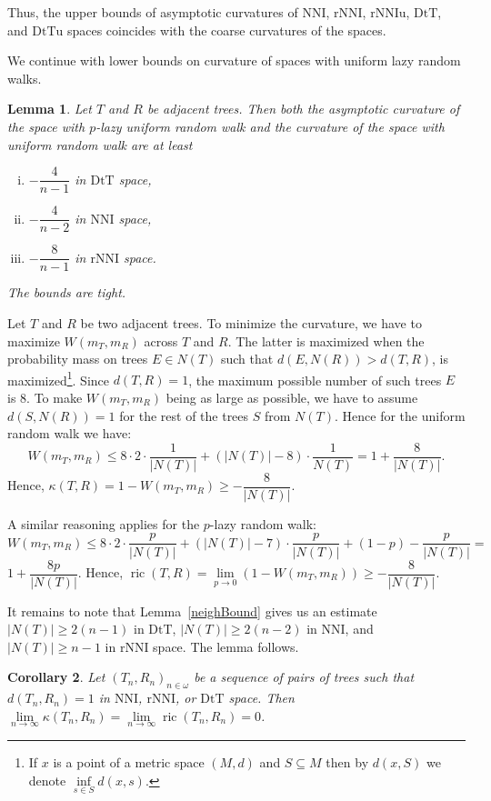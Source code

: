 \documentclass{amsart}
\newtheorem{lemma}{Lemma}
\newtheorem{corollary}[lemma]{Corollary}
\theoremstyle{definition}
\newcommand{\nni}{\mathrm{NNI}}
\newcommand{\rnni}{\mathrm{rNNI}}
\newcommand{\rnniu}{\mathrm{rNNIu}}
\newcommand{\dtt}{\mathrm{DtT}}
\newcommand{\dttu}{\mathrm{DtTu}}
\newcommand{\ric}{\operatorname{ric}}
\begin{document}
Thus, the upper bounds of asymptotic curvatures of $\nni$, $\rnni$, $\rnniu$, $\dtt$, and $\dttu$ spaces coincides with the coarse curvatures of the spaces.

We continue with lower bounds on curvature of spaces with uniform lazy random walks.

\begin{lemma}\label{uniformLower}
Let $T$ and $R$ be adjacent trees.
Then both the asymptotic curvature of the space with $p$-lazy uniform random walk and the curvature of the space with uniform random walk are at least
\begin{enumerate}[(i)]
\item $-\dfrac{4}{n-1}$ in $\dtt$ space,
\item $-\dfrac{4}{n-2}$ in $\nni$ space,
\item $-\dfrac{8}{n-1}$ in $\rnni$ space.
\end{enumerate}

The bounds are tight.
\end{lemma}

\proof
Let $T$ and $R$ be two adjacent trees.
To minimize the curvature, we have to maximize $W(m_T, m_R)$ across $T$ and $R$.
The latter is maximized when the probability mass on trees $E\in N(T)$ such that $d(E, N(R)) > d(T, R)$, is
maximized\footnote{If $x$ is a point of a metric space $(M,d)$ and $S \subseteq M$ then by $d(x,S)$ we denote $\inf\limits_{s \in S} d(x,s)$.}.
Since $d(T, R) = 1$, the maximum possible number of such trees $E$ is
$8$.
To make $W(m_T,m_R)$ being as large as possible, we have to assume $d(S, N(R)) = 1$ for the rest of the trees $S$ from $N(T)$.
Hence for the uniform random walk we have:
\[
W(m_T,m_R)\leq 8 \cdot 2 \cdot \frac{1}{|N(T)|} +
(|N(T)| - 8) \cdot \frac{1}{N(T)} = 1 + \dfrac{8}{|N(T)|}.
\]
Hence, $\kappa(T,R) = 1 - W(m_T,m_R) \geq - \dfrac{8}{|N(T)|}$.

A similar reasoning applies for the $p$-lazy random walk:
\[
W(m_T,m_R)\leq 8 \cdot 2 \cdot \frac{p}{|N(T)|} +
(|N(T)| - 7) \cdot \frac{p}{|N(T)|} + (1-p) - \frac{p}{|N(T)|} =
\]
$1 + \dfrac{8p}{|N(T)|}$.
Hence, $\ric(T,R) = \lim\limits_{p\to0}\left(1 - W(m_T,m_R)\right) \geq - \dfrac{8}{|N(T)|}$.

It remains to note that Lemma~\ref{neighBound} gives us an estimate $|N(T)| \geq 2(n-1)$ in $\dtt$, $|N(T)| \geq 2(n-2)$ in $\nni$, and $|N(T)| \geq n-1$ in $\rnni$ space.
The lemma follows.
\endproof

\begin{corollary}\label{flatInLimDTS}
Let $(T_n,R_n)_{n\in\omega}$ be a sequence of pairs of trees such that $d(T_n,R_n) = 1$ in $\nni$, $\rnni$, or $\dtt$ space.
Then $\lim\limits_{n \to \infty}\kappa(T_n,R_n) = \lim\limits_{n \to \infty}\ric(T_n,R_n) = 0$.
\end{corollary}
\end{document}
